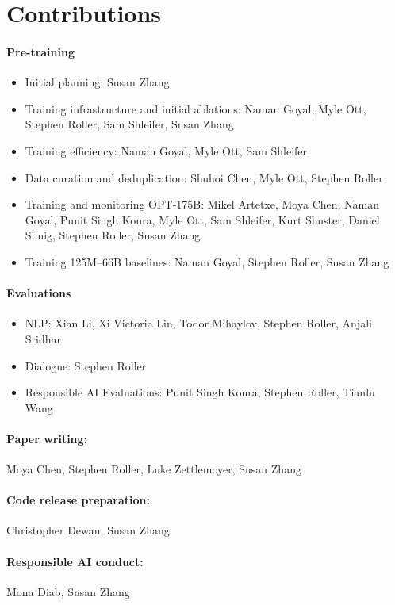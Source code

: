 \documentclass[11pt]{article}
\newcommand{\OPT}[0]{{OPT-175B}}
\begin{document}
\section{Contributions}
\label{sec:contributions}
\paragraph{Pre-training}
    \begin{itemize}
        \item {Initial planning:} Susan Zhang
        \item {Training infrastructure and initial ablations:} Naman Goyal, Myle Ott, Stephen Roller, Sam Shleifer, Susan Zhang
        \item {Training efficiency:} Naman Goyal, Myle Ott, Sam Shleifer
        \item {Data curation and deduplication:} Shuhoi Chen, Myle Ott, Stephen Roller
        \item {Training and monitoring \OPT{}:} Mikel Artetxe, Moya Chen, Naman Goyal, Punit Singh Koura, Myle Ott, Sam Shleifer, Kurt Shuster, Daniel Simig, Stephen Roller, Susan Zhang
        \item {Training 125M--66B baselines:} Naman Goyal, Stephen Roller, Susan Zhang
    \end{itemize}
\paragraph{Evaluations} 
    \begin{itemize}
        \item {NLP:} Xian Li, Xi Victoria Lin, Todor Mihaylov, Stephen Roller, Anjali Sridhar
        \item {Dialogue:} Stephen Roller
        \item {Responsible AI Evaluations:} Punit Singh Koura, Stephen Roller, Tianlu Wang
    \end{itemize}
\paragraph{Paper writing:} Moya Chen, Stephen Roller, Luke Zettlemoyer, Susan Zhang
\paragraph{Code release preparation:} Christopher Dewan, Susan Zhang
\paragraph{Responsible AI conduct:} Mona Diab, Susan Zhang
\end{document}
